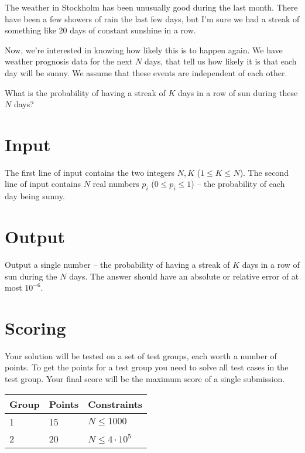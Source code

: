 The weather in Stockholm has been unusually good during the last month.
There have been a few showers of rain the last few days, but I'm sure
we had a streak of something like 20 days of constant sunshine in a row.

Now, we're interested in knowing how likely this is to happen again.
We have weather prognosis data for the next $N$ days, that
tell us how likely it is that each day will be sunny.
We assume that these events are independent of each other.

What is the probability of having a streak of $K$ days in a row
of sun during these $N$ days?

\section*{Input}
The first line of input contains the two integers $N, K$ ($1 \le K \le N$).
The second line of input contains $N$ real numbers $p_i$ ($0 \le p_i \le 1$) --
the probability of each day being sunny.

\section*{Output}
Output a single number -- the probability of having a streak of $K$ days in a row
of sun during the $N$ days.
The answer should have an absolute or relative error of at most $10^{-6}$.

\section*{Scoring}
Your solution will be tested on a set of test groups, each worth a number of points.
To get the points for a test group you need to solve all test cases in the test group.
Your final score will be the maximum score of a single submission.

\noindent
\begin{tabular}{| l | l | l |}
\hline
Group & Points & Constraints \\ \hline
1     & 15     & $N \le 1000$ \\ \hline
2     & 20     & $N \le 4 \cdot 10^5$ \\ \hline
\end{tabular}
